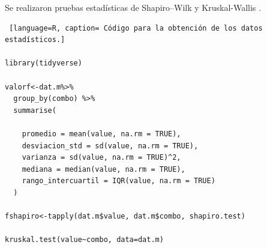\documentclass{article}
\begin{document}
Se realizaron pruebas estadísticas de  Shapiro–Wilk \cite{shapiro} y Kruskal-Wallis \cite{Kruskall}.

\begin{lstlisting} [language=R, caption= Código para la obtención de los datos estadísticos.]

library(tidyverse)

valorf<-dat.m%>%
  group_by(combo) %>%
  summarise(
    
    promedio = mean(value, na.rm = TRUE),
    desviacion_std = sd(value, na.rm = TRUE),
    varianza = sd(value, na.rm = TRUE)^2,
    mediana = median(value, na.rm = TRUE),
    rango_intercuartil = IQR(value, na.rm = TRUE)
  )

fshapiro<-tapply(dat.m$value, dat.m$combo, shapiro.test)

kruskal.test(value~combo, data=dat.m)
\end{lstlisting}
\end{document}
